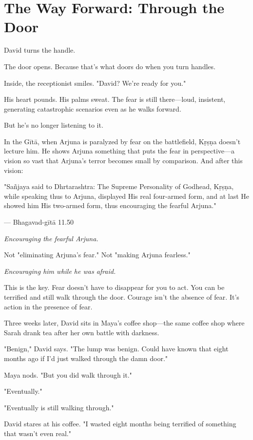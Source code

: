 \documentclass[11pt,twoside]{book}
\begin{document}
\section*{The Way Forward: Through the Door}

David turns the handle.

The door opens. Because that's what doors do when you turn handles.

Inside, the receptionist smiles. "David? We're ready for you."

His heart pounds. His palms sweat. The fear is still there—loud, insistent, generating catastrophic scenarios even as he walks forward.

But he's no longer listening to it.

In the Gītā, when Arjuna is paralyzed by fear on the battlefield, Kṛṣṇa doesn't lecture him. He shows Arjuna something that puts the fear in perspective—a vision so vast that Arjuna's terror becomes small by comparison. And after this vision:

\begin{pullquote}
"Sañjaya said to Dhrtarashtra: The Supreme Personality of Godhead, Kṛṣṇa, while speaking thus to Arjuna, displayed His real four-armed form, and at last He showed him His two-armed form, thus encouraging the fearful Arjuna."

--- Bhagavad-gītā 11.50
\end{pullquote}

\textit{Encouraging the fearful Arjuna.}

Not "eliminating Arjuna's fear." Not "making Arjuna fearless."

\textit{Encouraging him while he was afraid.}

This is the key. Fear doesn't have to disappear for you to act. You can be terrified and still walk through the door. Courage isn't the absence of fear. It's action in the presence of fear.

Three weeks later, David sits in Maya's coffee shop—the same coffee shop where Sarah drank tea after her own battle with darkness.

"Benign," David says. "The lump was benign. Could have known that eight months ago if I'd just walked through the damn door."

Maya nods. "But you did walk through it."

"Eventually."

"Eventually is still walking through."

David stares at his coffee. "I wasted eight months being terrified of something that wasn't even real."
\end{document}
